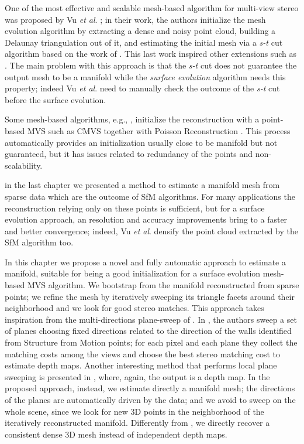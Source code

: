 One of the most effective and scalable mesh-based algorithm for multi-view stereo was proposed by Vu \emph{et al}. \cite{vu_et_al_2012}; in their work, the authors initialize the mesh evolution algorithm by extracting a dense and noisy point cloud, building a Delaunay triangulation out of it, and estimating the initial mesh via a \emph{s-t} cut algorithm based on the work of \cite{labatut2007efficient}. 
This last work inspired other extensions such as \cite{jancosek2011multi}.
The main problem with this approach is that the \emph{s-t} cut does not guarantee the output mesh to be a manifold while the \emph{surface evolution} algorithm needs this property; indeed Vu \emph{et al}.  need to manually check the outcome of the \emph{s-t} cut before the surface evolution.

Some mesh-based algorithms, e.g., \cite{pan2015automatic,li2015detail}, initialize the reconstruction with a point-based MVS such as CMVS \cite{fu10} together with Poisson Reconstruction \cite{kazhdan2006poisson}.
This process automatically provides an initialization usually close to be manifold but not guaranteed, but it has issues related to redundancy of the points and non-scalability.

in the last chapter we presented a method   to estimate a manifold mesh  from sparse data which are the outcome of SfM algorithms. 
For many applications the reconstruction relying only on these points is sufficient, but for a surface evolution approach, an resolution and accuracy improvements bring to a faster and better convergence; indeed, Vu \emph{et al}. \cite{vu_et_al_2012} densify the point cloud extracted by the SfM algorithm too.

In this chapter we propose a novel and fully automatic approach to estimate a manifold, suitable for being a good initialization for a surface evolution mesh-based MVS algorithm.
We bootstrap from the manifold reconstructed from sparse points; we refine the mesh by iteratively sweeping its triangle facets around their neighborhood and we look for good stereo matches.
This approach takes inspiration from the multi-directions plane-sweep of \cite{gallup2007real}.
In \cite{gallup2007real}, the authors sweep a set of planes choosing fixed directions related to the direction of the walls identified from Structure from Motion points; for each pixel and each plane they collect the matching costs among the views and choose the best stereo matching cost to estimate depth maps.
Another interesting method that performs local plane sweeping is presented in \cite{sinha2014efficient}, where, again, the output is a depth map.
In the proposed approach, instead, we estimate directly a manifold mesh; the directions of the planes are automatically driven by the data; and we avoid to sweep on the whole scene, since we look for new 3D points in the neighborhood of the iteratively reconstructed manifold. 
Differently from \cite{gallup2007real}, we directly recover a consistent dense 3D mesh instead of independent depth maps.

